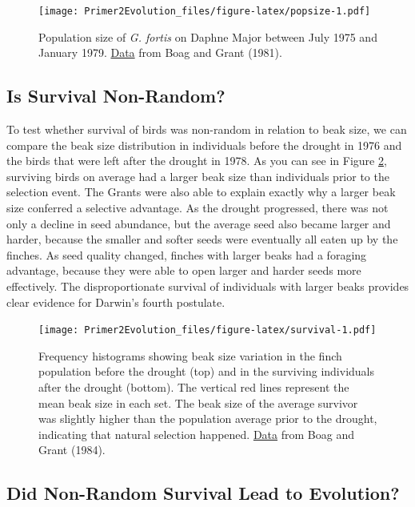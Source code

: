 \documentclass[
]{book}
\begin{document}
\begin{figure}
\centering
\texttt{[image: Primer2Evolution\_files/figure-latex/popsize-1.pdf]}
\caption{\label{fig:popsize}Population size of \emph{G. fortis} on Daphne Major between July 1975 and January 1979. \href{data/3_population_size.csv}{Data} from Boag and Grant (1981).}
\end{figure}

\hypertarget{is-survival-non-random}{%
\subsection{Is Survival Non-Random?}\label{is-survival-non-random}}

To test whether survival of birds was non-random in relation to beak size, we can compare the beak size distribution in individuals before the drought in 1976 and the birds that were left after the drought in 1978. As you can see in Figure \ref{fig:survival}, surviving birds on average had a larger beak size than individuals prior to the selection event. The Grants were also able to explain exactly why a larger beak size conferred a selective advantage. As the drought progressed, there was not only a decline in seed abundance, but the average seed also became larger and harder, because the smaller and softer seeds were eventually all eaten up by the finches. As seed quality changed, finches with larger beaks had a foraging advantage, because they were able to open larger and harder seeds more effectively. The disproportionate survival of individuals with larger beaks provides clear evidence for Darwin's fourth postulate.

\begin{figure}
\centering
\texttt{[image: Primer2Evolution\_files/figure-latex/survival-1.pdf]}
\caption{\label{fig:survival}Frequency histograms showing beak size variation in the finch population before the drought (top) and in the surviving individuals after the drought (bottom). The vertical red lines represent the mean beak size in each set. The beak size of the average survivor was slightly higher than the population average prior to the drought, indicating that natural selection happened. \href{data/3_beak_size_variation.csv}{Data} from Boag and Grant (1984).}
\end{figure}

\hypertarget{did-non-random-survival-lead-to-evolution}{%
\subsection{Did Non-Random Survival Lead to Evolution?}\label{did-non-random-survival-lead-to-evolution}}
\end{document}
